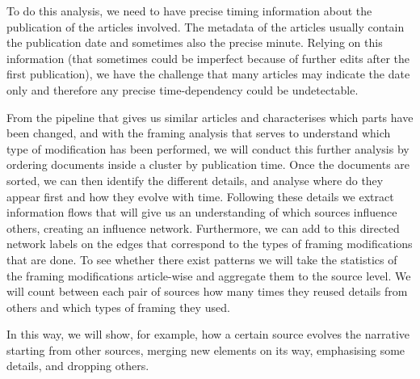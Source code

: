 To do this analysis, we need to have precise timing information about the publication of the articles involved.
The metadata of the articles usually contain the publication date and sometimes also the precise minute.
Relying on this information (that sometimes could be imperfect because of further edits after the first publication), we have the challenge that many articles may indicate the date only and therefore any precise time-dependency could be undetectable.

From the pipeline that gives us similar articles and characterises which parts have been changed, and with the framing analysis that serves to understand which type of modification has been performed, we will conduct this further analysis by ordering documents inside a cluster by publication time.
Once the documents are sorted, we can then identify the different details, and analyse where do they appear first and how they evolve with time.
Following these details we extract information flows that will give us an understanding of which sources influence others, creating an influence network.
Furthermore, we can add to this directed network labels on the edges that correspond to the types of framing modifications that are done.
To see whether there exist patterns we will take the statistics of the framing modifications article-wise and aggregate them to the source level.
We will count between each pair of sources how many times they reused details from others and which types of framing they used.

In this way, we will show, for example, how a certain source evolves the narrative starting from other sources, merging new elements on its way, emphasising some details, and dropping others.







